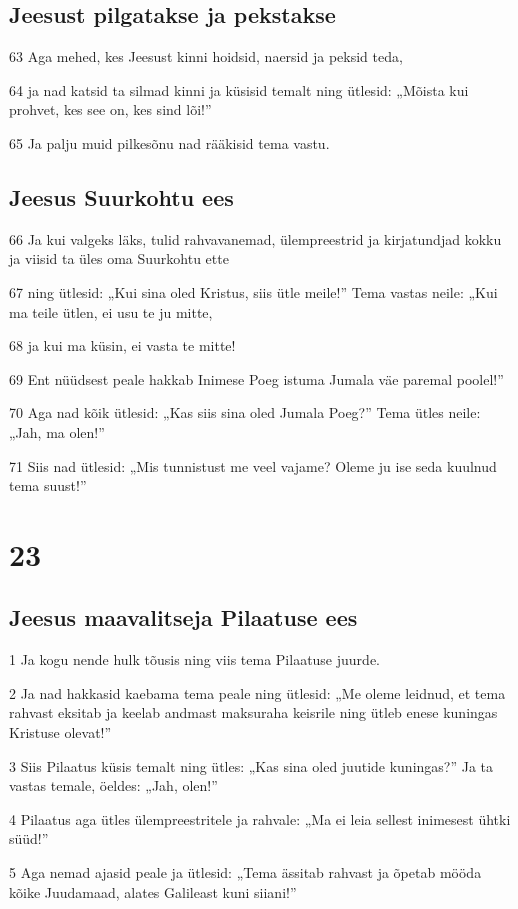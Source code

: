 \section*{Jeesust pilgatakse ja pekstakse}

\par 63 Aga mehed, kes Jeesust kinni hoidsid, naersid ja peksid teda,
\par 64 ja nad katsid ta silmad kinni ja küsisid temalt ning ütlesid: „Mõista kui prohvet, kes see on, kes sind lõi!”
\par 65 Ja palju muid pilkesõnu nad rääkisid tema vastu.

\section*{Jeesus Suurkohtu ees}

\par 66 Ja kui valgeks läks, tulid rahvavanemad, ülempreestrid ja kirjatundjad kokku ja viisid ta üles oma Suurkohtu ette
\par 67 ning ütlesid: „Kui sina oled Kristus, siis ütle meile!” Tema vastas neile: „Kui ma teile ütlen, ei usu te ju mitte,
\par 68 ja kui ma küsin, ei vasta te mitte!
\par 69 Ent nüüdsest peale hakkab Inimese Poeg istuma Jumala väe paremal poolel!”
\par 70 Aga nad kõik ütlesid: „Kas siis sina oled Jumala Poeg?” Tema ütles neile: „Jah, ma olen!”
\par 71 Siis nad ütlesid: „Mis tunnistust me veel vajame? Oleme ju ise seda kuulnud tema suust!”


\chapter{23}

\section*{Jeesus maavalitseja Pilaatuse ees}

\par 1 Ja kogu nende hulk tõusis ning viis tema Pilaatuse juurde.
\par 2 Ja nad hakkasid kaebama tema peale ning ütlesid: „Me oleme leidnud, et tema rahvast eksitab ja keelab andmast maksuraha keisrile ning ütleb enese kuningas Kristuse olevat!”
\par 3 Siis Pilaatus küsis temalt ning ütles: „Kas sina oled juutide kuningas?” Ja ta vastas temale, öeldes: „Jah, olen!”
\par 4 Pilaatus aga ütles ülempreestritele ja rahvale: „Ma ei leia sellest inimesest ühtki süüd!”
\par 5 Aga nemad ajasid peale ja ütlesid: „Tema ässitab rahvast ja õpetab mööda kõike Juudamaad, alates Galileast kuni siiani!”

